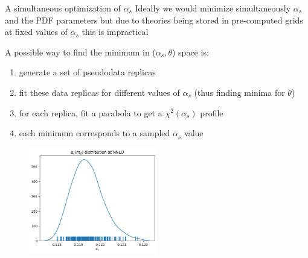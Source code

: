 \documentclass[8pt,t]{beamer}
\begin{document}
\begin{frame}{A simultaneous optimization of $\alpha_s$}
  Ideally we would minimize simultaneously $\alpha_s$ and the PDF parameters but due to theories being stored in pre-computed grids at fixed values of $\alpha_s$ this is impractical


  \vspace*{1em}

  A possible way to find the minimum in ($\alpha_s, \theta$) space is:
  \begin{enumerate}
    \item generate a set of pseudodata replicas
    \item fit these data replicas for different values of $\alpha_s$ (thus finding minima for $\theta$)
    \item for each replica, fit a parabola to get a $\chi^2(\alpha_s)$ profile
    \item each minimum corresponds to a sampled $\alpha_s$ value
  \end{enumerate}


  \begin{figure}
    \includegraphics[width=0.5\textwidth]{alphas_density.png}
  \end{figure}

\end{frame}
\end{document}
